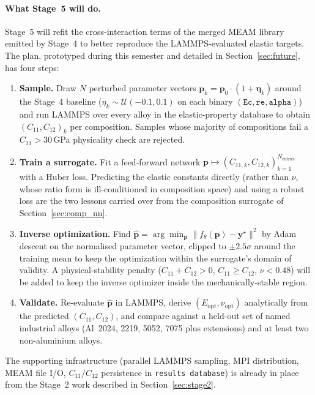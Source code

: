 \paragraph{What Stage~5 will do.}
Stage~5 will refit the cross-interaction terms of the merged MEAM library
emitted by Stage~4 to better reproduce the LAMMPS-evaluated elastic
targets. The plan, prototyped during this semester and detailed in
Section~\ref{sec:future}, has four steps:
\begin{enumerate}
	\item \textbf{Sample.} Draw $N$ perturbed parameter vectors
	      $\mathbf{p}_k = \mathbf{p}_0 \cdot (1+\boldsymbol{\eta}_k)$
	      around the Stage~4 baseline ($\eta_k\sim\mathcal{U}(-0.1,0.1)$
	      on each binary $(\texttt{Ec},\texttt{re},\texttt{alpha})$) and
	      run LAMMPS over every alloy in the elastic-property database
	      to obtain $(C_{11},C_{12})_k$ per composition. Samples whose
	      majority of compositions fail a $C_{11}>30$\,GPa physicality
	      check are rejected.
	\item \textbf{Train a surrogate.} Fit a feed-forward network
	      $\mathbf{p}\!\mapsto\!(C_{11,k},C_{12,k})_{k=1}^{N_\mathrm{entries}}$
	      with a Huber loss. Predicting the elastic constants directly
	      (rather than $\nu$, whose ratio form is ill-conditioned in
	      composition space) and using a robust loss are the two
	      lessons carried over from the composition surrogate of
	      Section~\ref{sec:comp_nn}.
	\item \textbf{Inverse optimization.} Find
	      $\hat{\mathbf{p}} = \arg\min_{\mathbf{p}} \lVert
	      f_\theta(\mathbf{p}) - \mathbf{y}^\star \rVert^2$ by Adam
	      descent on the normalised parameter vector, clipped to
	      $\pm 2.5\sigma$ around the training mean to keep the
	      optimization within the surrogate's domain of validity. A
	      physical-stability penalty
	      ($C_{11}+C_{12}>0$, $C_{11}\geq C_{12}$, $\nu<0.48$) will be
	      added to keep the inverse optimizer inside the
	      mechanically-stable region.
	\item \textbf{Validate.} Re-evaluate $\hat{\mathbf{p}}$ in LAMMPS,
	      derive $(E_\mathrm{opt},\nu_\mathrm{opt})$ analytically from
	      the predicted $(C_{11},C_{12})$, and compare against a
	      held-out set of named industrial alloys
	      (Al~2024, 2219, 5052, 7075 plus extensions) and at least two
	      non-aluminium alloys.
\end{enumerate}
The supporting infrastructure (parallel LAMMPS sampling, MPI
distribution, MEAM file I/O, $C_{11}/C_{12}$ persistence in
\texttt{results database}) is already in place from the Stage~2 work
described in Section~\ref{sec:stage2}.

\newpage
